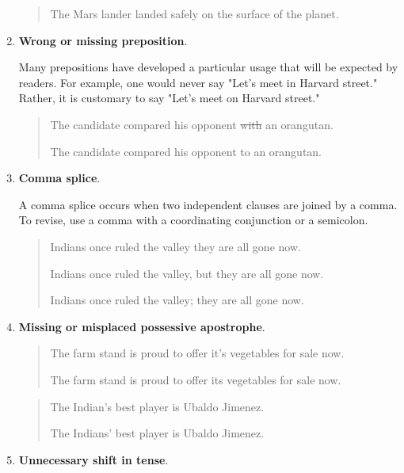\begin{enumerate}
\begin{quote}
The Mars lander landed safely on the surface of the planet.      
\end{quote}

\item \textbf{Wrong or missing preposition}.

Many prepositions have developed a particular usage that will be expected by readers. For example, one would never say "Let's meet in Harvard street." Rather, it is customary to say "Let's meet on Harvard street."
 
 \begin{quote}
The candidate compared his opponent \sout{with} an orangutan.      

The candidate compared his opponent to an orangutan.      
\end{quote}

\item \textbf{Comma splice}.

A comma splice occurs when two independent clauses are joined by a comma. To revise, use a comma with a coordinating conjunction or a semicolon.

\begin{quote}
Indians once ruled the valley they are all gone now.      

Indians once ruled the valley, but they are all gone now.      

Indians once ruled the valley; they are all gone now.      
 
\end{quote}

\item \textbf{Missing or misplaced possessive apostrophe}. 

\begin{quote}
The farm stand is proud to offer it's vegetables for sale now.      

The farm stand is proud to offer its vegetables for sale now.      
\end{quote}

\begin{quote}

The Indian's best player is Ubaldo Jimenez.      

The Indians' best player is Ubaldo Jimenez.      
	
\end{quote}


\item \textbf{Unnecessary shift in tense}.


\end{enumerate}
